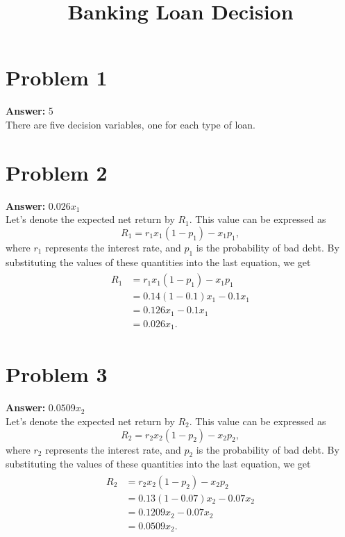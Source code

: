 \documentclass[11pt]{article}
\date{}
\title{Banking Loan Decision}
\begin{document}
\thispagestyle{empty}
\pagestyle{empty}
\section*{Problem 1}
\label{sec:org31c63f0}

\textbf{Answer:} 5\\

There are five decision variables, one for each type of loan.
\section*{Problem 2}
\label{sec:orge0bffc5}

\textbf{Answer:} \(0.026x_1\)\\

Let's denote the expected net return by \(R_1\). This value can be expressed as
\begin{equation}
R_1=r_1 x_1(1-p_1)-x_1 p_1,
\end{equation}
where \(r_1\) represents the interest rate, and \(p_1\) is the probability
of bad debt. By substituting the values of these quantities into the last
equation, we get
\begin{align}
  \begin{split}
    R_1&=r_1 x_1(1-p_1)-x_1 p_1\\
    &=0.14(1-0.1)x_1-0.1x_1\\
    &=0.126x_1-0.1x_1\\
    &=0.026x_1.
  \end{split}
\end{align}
\section*{Problem 3}
\label{sec:orgd74a25f}

\textbf{Answer:} \(0.0509x_2\)\\

Let's denote the expected net return by \(R_2\). This value can be expressed as
\begin{equation}
R_2=r_2 x_2(1-p_2)-x_2 p_2,
\end{equation}
where \(r_2\) represents the interest rate, and \(p_2\) is the probability
of bad debt. By substituting the values of these quantities into the last
equation, we get
\begin{align}
  \begin{split}
    R_2&=r_2 x_2(1-p_2)-x_2 p_2\\
    &=0.13(1-0.07)x_2-0.07x_2\\
    &=0.1209x_2-0.07x_2\\
    &=0.0509x_2.
  \end{split}
\end{align}
\end{document}
